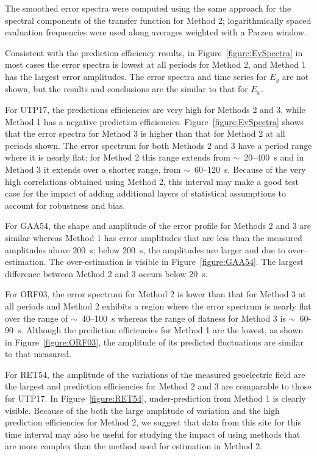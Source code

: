 \documentclass[12pt]{article}
\begin{document}
The smoothed error spectra were computed using the same approach for the spectral components of the transfer function for Method 2; logarithmically spaced evaluation frequencies were used along averages weighted with a Parzen window.


Consistent with the prediction efficiency results, in Figure~\ref{figure:EySpectra} in most cases the error spectra is lowest at all periods for Method 2, and Method 1 has the largest error amplitudes. The error spectra and time series for $E_y$ are not shown, but the results and conclusions are the similar to that for $E_x$. 

For UTP17, the predictions efficiencies are very high for Methods 2 and 3, while Method 1 has a negative prediction efficiencies.  Figure~\ref{figure:EySpectra} shows that the error spectra for Method 3 is higher than that for Method 2 at all periods shown.  The error spectrum for both Methods 2 and 3 have a period range where it is nearly flat; for Method 2 this range extends from $\sim$~20--400~s and in Method 3 it extends over a shorter range, from $\sim$~60--120~s.  Because of the very high correlations obtained using Method 2, this interval may make a good test case for the impact of adding additional layers of statistical assumptions to account for robustness and bias.

For GAA54, the shape and amplitude of the error profile for Methods 2 and 3 are similar whereas Method 1 has error amplitudes that are less than the measured amplitudes above 200~s; below 200~s, the amplitudes are larger and due to over--estimation.  The over-estimation is visible in Figure~\ref{figure:GAA54}.  The largest difference between Method 2 and 3 occurs below 20~s.

For ORF03, the error spectrum for Method 2 is lower than that for Method 3 at all periods and Method 2 exhibits a region where the error spectrum is nearly flat over the range of $\sim$~40--100~s whereas the range of flatness for Method 3 is $\sim$~60-90~s.  Although the prediction efficiencies for Method 1 are the lowest, as shown in Figure~\ref{figure:ORF03}, the amplitude of its predicted fluctuations are similar to that measured.

For RET54, the amplitude of the variations of the measured geoelectric field are the largest and prediction efficiencies for Method 2 and 3 are comparable to those for UTP17.  In Figure~\ref{figure:RET54}, under-prediction from Method 1 is clearly visible.  Because of the both the large amplitude of variation and the high prediction efficiencies for Method 2, we suggest that data from this site for this time interval may also be useful for studying the impact of using methods that are more complex than the method used for estimation in Method 2.
\end{document}
